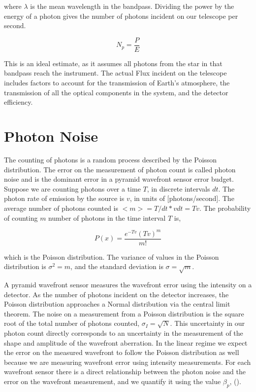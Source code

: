 where $\lambda$ is the mean wavelength in the bandpass. Dividing the power by the energy of a photon gives the number of photons incident on our telescope per second.

\begin{equation}
    N_p=\frac{P}{E}
\end{equation}

This is an ideal estimate, as it assumes all photons from the star in that bandpass reach the instrument. The actual Flux incident on the telescope includes factors to account for the transmission of Earth's atmosphere, the transmission of all the optical components in the system, and the detector efficiency. 


\section{Photon Noise}\label{PhotNoise}

The counting of photons is a random process described by the Poisson distribution. The error on the measurement of photon count is called photon noise and is the dominant error in a pyramid wavefront sensor error budget. Suppose we are counting photons over a time $T$, in discrete intervals $dt$. The photon rate of emission by the source is $v$, in units of [photons/second]. The average number of photons counted is $<m>=T/dt * vdt=Tv$. The probability of counting $m$ number of photons in the time interval $T$ is,

\begin{equation}
    P(x)=\frac{e^{-Tv} (Tv)^m}{m!}
\end{equation}

\noindent which is the Poisson distribution. The variance of values in the Poisson distribution is $\sigma^2=m$, and the standard deviation is $\sigma=\sqrt{m}$. 

A pyramid wavefront sensor measures the wavefront error using the intensity on a detector. As the number of photons incident on the detector increases, the Poisson distribution approaches a Normal distribution via the central limit theorem. The noise on a measurement from a Poisson distribution is the square root of the total number of photons counted, $\sigma_I=\sqrt{N}.$ This uncertainty in our photon count directly corresponds to an uncertainty in the measurement of the shape and amplitude of the wavefront aberration. In the linear regime we expect the error on the measured wavefront to follow the Poisson distribution as well because we are measuring wavefront error using intensity measurements. For each wavefront sensor there is a direct relationship between the photon noise and the error on the wavefront measurement, and we quantify it using the value $\beta_p $, (\citep{guyon2005}).


